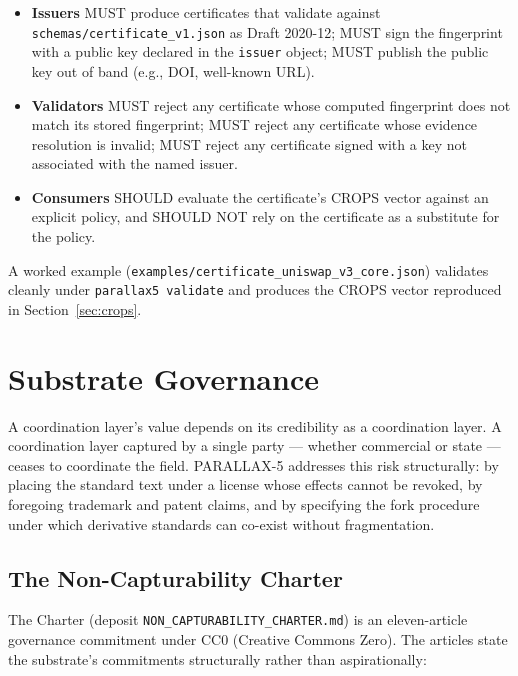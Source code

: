 \documentclass[11pt,a4paper]{article}
\begin{document}
\begin{itemize}
  \item \textbf{Issuers} MUST produce certificates that validate against \texttt{schemas/certificate\_v1.json} as Draft 2020-12; MUST sign the fingerprint with a public key declared in the \texttt{issuer} object; MUST publish the public key out of band (e.g., DOI, well-known URL).
  \item \textbf{Validators} MUST reject any certificate whose computed fingerprint does not match its stored fingerprint; MUST reject any certificate whose evidence resolution is invalid; MUST reject any certificate signed with a key not associated with the named issuer.
  \item \textbf{Consumers} SHOULD evaluate the certificate's CROPS vector against an explicit policy, and SHOULD NOT rely on the certificate as a substitute for the policy.
\end{itemize}

A worked example (\texttt{examples/certificate\_uniswap\_v3\_core.json}) validates cleanly under \texttt{parallax5 validate} and produces the CROPS vector reproduced in Section~\ref{sec:crops}.

\section{Substrate Governance}\label{sec:governance}

A coordination layer's value depends on its credibility as a coordination layer. A coordination layer captured by a single party --- whether commercial or state --- ceases to coordinate the field. PARALLAX-5 addresses this risk structurally: by placing the standard text under a license whose effects cannot be revoked, by foregoing trademark and patent claims, and by specifying the fork procedure under which derivative standards can co-exist without fragmentation.

\subsection{The Non-Capturability Charter}

The Charter (deposit \texttt{NON\_CAPTURABILITY\_CHARTER.md}) is an eleven-article governance commitment under CC0 (Creative Commons Zero). The articles state the substrate's commitments structurally rather than aspirationally:
\end{document}
